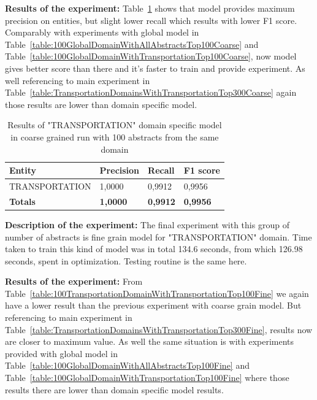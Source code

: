 \documentclass[thesis=M,english]{FITthesis}[2018/05/30]
\begin{document}
	\textbf{Results of the experiment:} Table~\ref{table:100TransportationDomainWithTransportationTop100Coarse} shows that model provides maximum precision on entities, but slight lower recall which results with lower F1 score. Comparably with experiments with global model in Table~\ref{table:100GlobalDomainWithAllAbstractsTop100Coarse} and Table~\ref{table:100GlobalDomainWithTransportationTop100Coarse}, now model gives better score than there and it's faster to train and provide experiment. As well referencing to main experiment in Table~\ref{table:TransportationDomainsWithTransportationTop300Coarse} again those results are lower than domain specific model. 

	\begin{table}[H]\centering
		\begin{tabular}{|l|l|l|l|}
			\hline {\textbf{Entity}} & {\textbf{Precision}} & {\textbf{Recall}} & {\textbf{F1 score}}\\\hline
				TRANSPORTATION & 1,0000 & 0,9912 & 0,9956\\\hline
				\textbf{Totals} & \textbf{1,0000} & \textbf{0,9912} & \textbf{0,9956}\\\hline
		\end{tabular}
		\caption{Results of "TRANSPORTATION" domain specific model in coarse grained run with 100 abstracts from the same domain \label{table:100TransportationDomainWithTransportationTop100Coarse}}
	\end{table}
	

	\textbf{Description of the experiment:} The final experiment with this group of number of abstracts is fine grain model for "TRANSPORTATION" domain. Time taken to train this kind of model was in total 134.6 seconds, from which 126.98 seconds, spent in optimization. Testing routine is the same here.

	\textbf{Results of the experiment:} From Table~\ref{table:100TransportationDomainWithTransportationTop100Fine} we again have a lower result than the previous experiment with coarse grain model. But referencing to main experiment in Table~\ref{table:TransportationDomainsWithTransportationTop300Fine}, results now are closer to maximum value. As well the same situation is with experiments provided with global model in Table~\ref{table:100GlobalDomainWithAllAbstractsTop100Fine} and Table~\ref{table:100GlobalDomainWithTransportationTop100Fine} where those results there are lower than domain specific model results.
	
\end{document}
